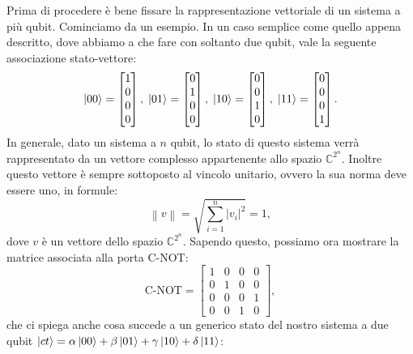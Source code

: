 \documentclass{book}
\theoremstyle{definition}
\theoremstyle{definition}
\theoremstyle{definition}
\theoremstyle{plain}
\theoremstyle{plain}
\theoremstyle{plain}
\theoremstyle{plain}
\begin{document}
Prima di procedere è bene fissare la rappresentazione vettoriale di un sistema a più qubit. Cominciamo da un esempio. In un caso semplice come quello appena descritto, dove abbiamo a che fare con soltanto due qubit, vale la seguente associazione stato-vettore:
\begin{displaymath}
\ket{00} = 
\begin{bmatrix}
1\\
0\\
0\\
0
\end{bmatrix} , \;
\ket{01} = 
\begin{bmatrix}
0\\
1\\
0\\
0
\end{bmatrix} , \;
\ket{10} = 
\begin{bmatrix}
0\\
0\\
1\\
0
\end{bmatrix} , \;
\ket{11} = 
\begin{bmatrix}
0\\
0\\
0\\
1
\end{bmatrix}.
\end{displaymath}
In generale, dato un sistema a $n$ qubit, lo stato di questo sistema verrà rappresentato da un vettore complesso appartenente allo spazio $\mathbb{C}^{2^{n}}$. Inoltre questo vettore è sempre sottoposto al vincolo unitario, ovvero la sua norma deve essere uno, in formule:
\begin{equation}\label{norm_two}
\left\lVert v \right\rVert = \sqrt{\sum_{i=1}^{n}\left\lvert v_{i} \right\rvert^{2}} = 1,
\end{equation}
dove $v$ è un vettore dello spazio $\mathbb{C}^{2^{n}}$. Sapendo questo, possiamo ora mostrare la matrice associata alla porta C-NOT:
\begin{displaymath}
\mbox{C-NOT} = 
\begin{bmatrix}
1 & 0 & 0 & 0\\
0 & 1 & 0 & 0\\
0 & 0 & 0 & 1\\
0 & 0 & 1 & 0
\end{bmatrix} ,
\end{displaymath}
che ci spiega anche cosa succede a un generico stato del nostro sistema a due qubit $\ket{ct} = \alpha \ket{00} + \beta \ket{01} + \gamma \ket{10} + \delta \ket{11}$:
\end{document}
